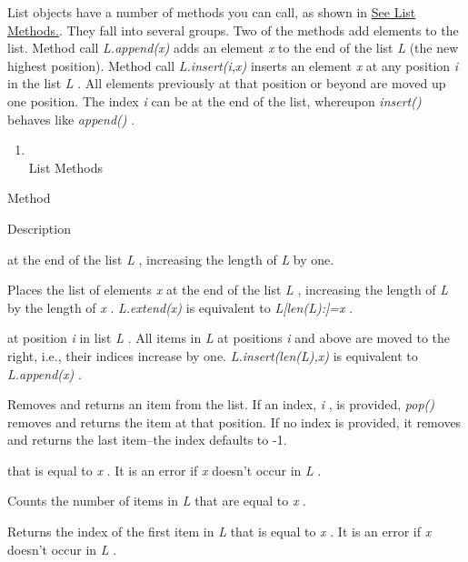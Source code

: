 List objects have a number of
methods you can call, as shown in \href{chap2.html\#20881}{See List
Methods.}. They fall into several groups. Two of the methods add
elements to the list. Method call \emph{L.append(x)} adds an element
\emph{x} to the end of the list \emph{L} (the new highest position).
Method call \emph{L.insert(i,x)} inserts an element \emph{x} at any
position \emph{i} in the list \emph{L} . All elements previously at that
position or beyond are moved up one position. The index \emph{i} can be
at the end of the list, whereupon \emph{insert()} behaves like
\emph{append()} .

\begin{enumerate}

\item
  \\
  List Methods
\end{enumerate}

Method

Description



 at the end of the
list \emph{L} , increasing the length of \emph{L} by one.



Places the list of elements
\emph{x} at the end of the list \emph{L} , increasing the length of
\emph{L} by the length of \emph{x} . \emph{L.extend(x)} is equivalent to
\emph{L{[}len(L):{]}=x} .



 at position
\emph{i} in list \emph{L} . All items in \emph{L} at positions \emph{i}
and above are moved to the right, i.e., their indices increase by one.
\emph{L.insert(len(L),x)} is equivalent to \emph{L.append(x)} .





Removes and returns an item from
the list. If an index, \emph{i} , is provided, \emph{pop()} removes and
returns the item at that position. If no index is provided, it removes
and returns the last item--the index defaults to -1.




that is equal to \emph{x} . It is an error if \emph{x} doesn't occur in
\emph{L} .



Counts the number of items in
\emph{L} that are equal to \emph{x} .



Returns the index of the first item
in \emph{L} that is equal to \emph{x} . It is an error if \emph{x}
doesn't occur in \emph{L} .



